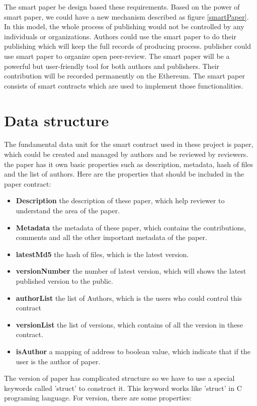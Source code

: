 \documentclass[openany,12pt]{ecsthesis}      %
\begin{document}
The smart paper be design based these requirements. 
Based on the power of smart paper, we could have a new mechanism described as figure \ref{smartPaper}. 
In this model, the whole process of publishing would not be controlled by any individuals or organizations.
Authors could use the smart paper to do their publishing which will keep the full records of producing process. 
publisher could use smart paper to organize open peer-review. 
The smart paper will be a powerful but user-friendly tool for both authors and publishers.
Their contribution will be recorded permanently on the Ethereum. 
The smart paper consists of smart contracts which are used to implement those functionalities. 
\section{Data structure}
The fundamental data unit for the smart contract used in these project is paper, 
which could be created and managed by authors and be reviewed by reviewers.
the paper has it own basic properties such as description, metadata, hash of files and the list of authors.
Here are the properties that should be included in the paper contract:
\begin{itemize}
  \item \textbf{Description} the description of these paper, which help reviewer to understand the area of the paper.
  \item \textbf{Metadata} the metadata of these paper, which contains the contributions, comments and all the other important metadata of the paper.
  \item \textbf{latestMd5} the hash of files, which is the latest version.
  \item \textbf{versionNumber} the number of latest version, which will shows the latest published version to the public.
  \item \textbf{authorList} the list of Authors, which is the users who could control this contract
  \item \textbf{versionList} the list of versions, which contains of all the version in these contract.
  \item \textbf{isAuthor} a mapping of address to boolean value, which indicate that if the user is the author of paper.
\end{itemize}
The version of paper has complicated structure so we have to use a special keywords called 'struct' to construct it. 
This keyword works like 'struct' in C programing language.
For version, there are some properties:
\end{document}
